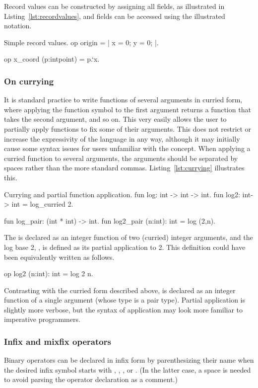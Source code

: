 Record values can be constructed by assigning all fields, as illustrated in
Listing~\ref{lst:recordvalues}, and fields can be accessed using the
illustrated notation.

\begin{easycrypt}[label={lst:recordvalues}]{Simple record values.}
op origin = {| x = 0; y = 0; |}.

op x_coord (p:intpoint) = p.`x.
\end{easycrypt}

\subsubsection*{On currying}
It is standard practice to write functions of several arguments in curried form,
where applying the function symbol to the first argument returns a function that
takes the second argument, and so on. This very easily allows the user to
partially apply functions to fix some of their arguments. This does not restrict
or increase the expressivity of the language in any way, although it may
initially cause some syntax issues for users unfamiliar with the concept. When
applying a curried function to several arguments, the arguments should be
separated by spaces rather than the more standard commas.
Listing~\ref{lst:currying} illustrates this.

\begin{easycrypt}[label={lst:currying}]{Currying and partial function application.}
fun log: int -> int -> int.
fun log2: int-> int = log_curried 2.

fun log_pair: (int * int) -> int.
fun log2_pair (n:int): int = log (2,n).
\end{easycrypt}

The  is declared as an integer function of two (curried) integer
arguments, and the log base 2, , is defined as its partial
application to 2. This definition could have been equivalently written as
follows.
\begin{easycrypt}[frame=none]{}
op log2 (n:int): int = log 2 n.
\end{easycrypt}
Contrasting with the curried form described above,  is declared
as an integer function of a single argument (whose type is a pair type).
Partial application is slightly more verbose, but the syntax of application may
look more familiar to imperative programmers.

\subsubsection*{Infix and mixfix operators}
Binary operators can be declared in infix form by parenthesizing their name when
the desired infix symbol starts with \ec{+}, \ec{:}, \ec{^}, or \ec{*}. (In the
latter case, a space is needed to avoid parsing the operator declaration as a comment.)

